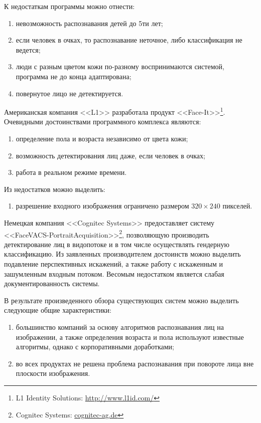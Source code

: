 К недостаткам программы можно отнести:
\begin{enumerate}
 \item невозможность распознавания детей до 5ти лет;
 \item если человек в очках, то распознавание неточное, либо
классификация не ведется;
 \item люди с разным цветом кожи по-разному воспринимаются системой, программа
не до конца адаптирована;
 \item повернутое лицо не детектируется.
\end{enumerate}

Американская компания <<L1>> разработала продукт <<Face-It>>\footnote{L1
Identity Solutions: \url{http://www.l1id.com/}}. Очевидными достоинствами
программного комплекса являются:
\begin{enumerate}
 \item определение пола и возраста независимо от цвета кожи;
 \item возможность детектирования лиц даже, если человек в очках;
 \item работа в реальном режиме времени.
\end{enumerate}

Из недостатков можно выделить:
\begin{enumerate}
 \item разрешение входного изображения ограничено размером $320\times240$
пикселей. 
\end{enumerate}

Немецкая компания <<Cognitec Systems>> предоставляет систему
<<FaceVACS-PortraitAcquisition>>\footnote{Cognitec Systems:
\url{cognitec-ag.de}}, позволяющую производить детектирование лиц в видопотоке
и в том числе осуществлять гендерную классификацию. Из заявленных
производителем достоинств можно выделить подавление перспективных искажений, а
также работу с искаженным и зашумленным входным потоком. Весомым недостатком
является слабая документированность системы.

В результате произведенного обзора существующих систем можно выделить
следующие общие характеристики:
\begin{enumerate}
 \item большинство компаний за основу алгоритмов распознавания лиц на
изображении, а также определения возраста и пола используют известные алгоритмы,
однако с корпоративными доработками;
 \item во всех продуктах не решена проблема распознавания при повороте лица вне
плоскости изображения.
\end{enumerate}


